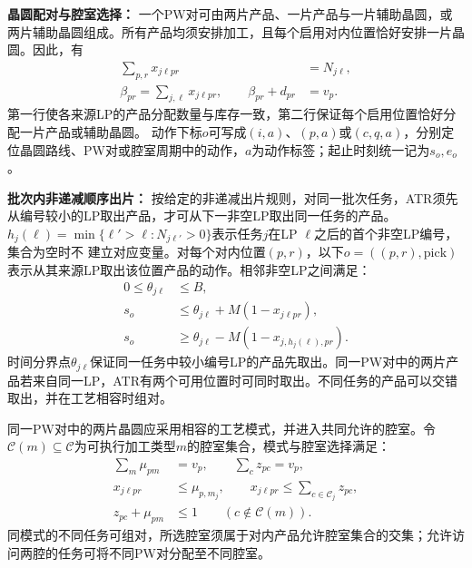 \documentclass[preprint,12pt,nonatbib]{elsarticle}
\begin{document}
\noindent\textbf{晶圆配对与腔室选择：}
一个PW对可由两片产品、一片产品与一片辅助晶圆，或两片辅助晶圆组成。所有产品均须安排加工，且每个启用对内位置恰好安排一片晶圆。因此，有
\begin{equation}
\begin{aligned}
\sum_{p,r}x_{j\ell pr}&=N_{j\ell},\\
\beta_{pr}=\sum_{j,\ell}x_{j\ell pr},\qquad
\beta_{pr}+d_{pr}&=v_p.
\end{aligned}
\label{eq:joint-membership-cn}
\end{equation}
第一行使各来源LP的产品分配数量与库存一致，第二行保证每个启用位置恰好分配一片产品或辅助晶圆。
动作下标$o$可写成$(i,a)$、$(p,a)$或$(c,q,a)$，分别定位晶圆路线、PW对或腔室周期中的动作，$a$为动作标签；起止时刻统一记为$s_o,e_o$。

\noindent\textbf{批次内非递减顺序出片：}
按给定的非递减出片规则，对同一批次任务，ATR须先从编号较小的LP取出产品，才可从下一非空LP取出同一任务的产品。
$h_j(\ell)=\min\{\ell'>\ell:N_{j\ell'}>0\}$表示任务$j$在LP $\ell$之后的首个非空LP编号，集合为空时不
建立对应变量。对每个对内位置$(p,r)$，以下$o=((p,r),\mathrm{pick})$表示从其来源LP取出该位置产品的动作。相邻非空LP之间满足：
\begin{equation}
\begin{aligned}
0\le\theta_{j\ell}&\le B,\\
s_o&\le\theta_{j\ell}+M(1-x_{j\ell pr}),\\
s_o&\ge\theta_{j\ell}-M(1-x_{j,h_j(\ell),pr}).
\end{aligned}
\label{eq:pjob-release-boundary-cn}
\end{equation}
时间分界点$\theta_{j\ell}$保证同一任务中较小编号LP的产品先取出。同一PW对中的两片产品若来自同一LP，ATR有两个可用位置时可同时取出。不同任务的产品可以交错取出，并在工艺相容时组对。

同一PW对中的两片晶圆应采用相容的工艺模式，并进入共同允许的腔室。令$\mathcal C(m)\subseteq\mathcal C$为可执行加工类型$m$的腔室集合，模式与腔室选择满足：
\begin{equation}
\begin{aligned}
\sum_m\mu_{pm}&=v_p,\qquad \sum_c z_{pc}=v_p,\\
x_{j\ell pr}&\le\mu_{p,m_j},\qquad
x_{j\ell pr}\le\sum_{c\in\mathcal C_j}z_{pc},\\
z_{pc}+\mu_{pm}&\le1\qquad(c\notin\mathcal C(m)).
\end{aligned}
\label{eq:joint-chamber-cn}
\end{equation}
同模式的不同任务可组对，所选腔室须属于对内产品允许腔室集合的交集；允许访问两腔的任务可将不同PW对分配至不同腔室。
\end{document}
